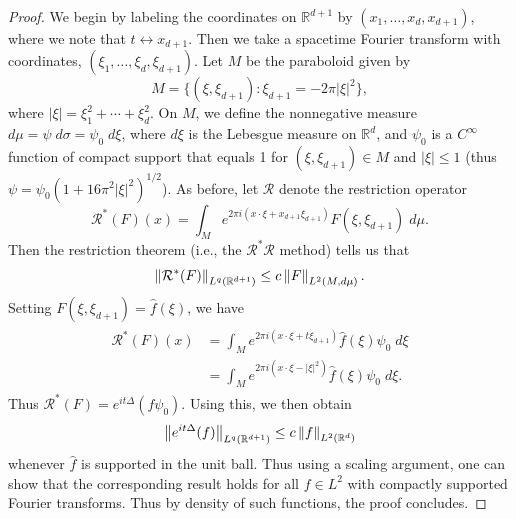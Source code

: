 \documentclass{article}
\begin{document}
\begin{proof}
	We begin by labeling the coordinates on $\mathbb{R}^{d + 1}$ by $(x_{1}, \ldots, x_{d}, x_{d + 1})$, where we note that $t \leftrightarrow x_{d + 1}$. Then we take a spacetime Fourier transform with coordinates, $(\xi_{1}, \ldots, \xi_{d}, \xi_{d + 1})$. Let $M$ be the paraboloid given by 
	\begin{equation*}
		M = \{(\xi, \xi_{d + 1}): \xi_{d + 1} = -2\pi |\xi|^{2}\}, 
	\end{equation*} 
	where $|\xi| = \xi_{1}^{2} + \dotsm + \xi_{d}^{2}$. On $M$, we define the nonnegative measure $d\mu = \psi\;d\sigma = \psi_{0}\;d\xi$, where $d\xi$ is the Lebesgue measure on $\mathbb{R}^{d}$, and $\psi_{0}$ is a $C^{\infty}$ function of compact support that equals 1 for $(\xi, \xi_{d + 1}) \in M$ and $|\xi| \leq 1$ (thus $\psi = \psi_{0}(1 + 16\pi^{2}|\xi|^{2})^{1/2}$). As before, let $\mathcal{R}$ denote the restriction operator 
	\begin{equation*}
		\mathcal{R}^{\ast}(F)(x) = \int_{M}e^{2\pi i (x \cdot \xi + x_{d + 1}\xi_{d + 1})}F(\xi, \xi_{d + 1})\;d\mu. 
	\end{equation*} 
	Then the restriction theorem (i.e., the $\mathcal{R}^{\ast}\mathcal{R}$ method) tells us that 
	\begin{equation*}
		\left\Vert \mathcal{R}^{\ast}(F) \right\Vert_{L^{q}(\mathbb{R}^{d + 1})} \leq c\left\Vert F \right\Vert_{L^{2}(M,d\mu)}. 
	\end{equation*} 
	Setting $F(\xi, \xi_{d + 1}) = \hat{f}(\xi)$, we have 
	\begin{align*}
		\begin{split}
			\mathcal{R}^{\ast}(F)(x) &= \int_{M}e^{2\pi i (x \cdot \xi + t\xi_{d + 1})}\hat{f}(\xi)\psi_{0}\;d\xi \\
			&= \int_{M}e^{2\pi i (x \cdot \xi - |\xi|^{2})}\hat{f}(\xi)\psi_{0}\;d\xi . 
		\end{split} 
	\end{align*} 
	Thus $\mathcal{R}^{\ast}(F) = e^{it\Delta}(f\psi_{0})$. Using this, we then obtain 
	\begin{equation*}
		\left\Vert e^{it\Delta}(f) \right\Vert_{L^{q}(\mathbb{R}^{d + 1})} \leq c\left\Vert f \right\Vert_{L^{2}(\mathbb{R}^{d})}
	\end{equation*} 
	whenever $\hat{f}$ is supported in the unit ball. Thus using a scaling argument, one can show that the corresponding result holds for all $f \in L^{2}$ with compactly supported Fourier transforms. Thus by density of such functions, the proof concludes.
\end{proof} 
\newpage 
\end{document}
